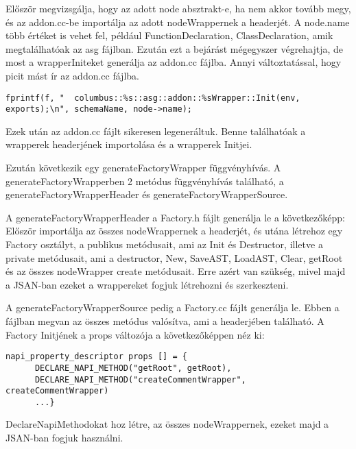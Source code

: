 Először megvizsgálja, hogy az adott node absztrakt-e, ha nem akkor tovább megy, és az addon.cc-be importálja az adott nodeWrappernek a headerjét.
A node.name több értéket is vehet fel, például FunctionDeclaration, ClassDeclaration, amik megtalálhatóak az asg fájlban.
Ezután ezt a bejárást mégegyszer végrehajtja, de most a wrapperIniteket generálja az addon.cc fájlba.
Annyi változtatással, hogy picit mást ír az addon.cc fájlba.
\begin{lstlisting}[caption={generateWrapInit leimplementálása}, label={lst:addoncc_wrapper_inits_implementation}, language={CStyle}]
fprintf(f, "  columbus::%s::asg::addon::%sWrapper::Init(env, exports);\n", schemaName, node->name);
\end{lstlisting}

Ezek után az addon.cc fájlt sikeresen legeneráltuk.
Benne találhatóak a wrapperek headerjének importolása és a wrapperek Initjei.

\noindent

Ezután következik egy generateFactoryWrapper függvényhívás.
A generateFactoryWrapperben 2 metódus függvényhívás található, a generateFactoryWrapperHeader és generateFactoryWrapperSource.

\noindent

A generateFactoryWrapperHeader a Factory.h fájlt generálja le a következőképp:
Először importálja az összes nodeWrappernek a headerjét, és utána létrehoz egy Factory osztályt, a publikus metódusait, ami az Init és Destructor, illetve a private metódusait,
ami a destructor, New, SaveAST, LoadAST, Clear, getRoot és az összes nodeWrapper create metódusait.
Erre azért van szükség, mivel majd a JSAN-ban ezeket a wrappereket fogjuk létrehozni és szerkeszteni.

\noindent

A generateFactoryWrapperSource pedig a Factory.cc fájlt generálja le.
Ebben a fájlban megvan az összes metódus valósítva, ami a headerjében található.
A Factory Initjének a props változója a következőképpen néz ki:

\begin{lstlisting}[caption={Factory.cc fájl}, label={factory_cc}, language={CStyle}]
napi_property_descriptor props [] = {
      DECLARE_NAPI_METHOD("getRoot", getRoot),
      DECLARE_NAPI_METHOD("createCommentWrapper", createCommentWrapper)
      ...}
\end{lstlisting}

DeclareNapiMethodokat hoz létre, az összes nodeWrappernek, ezeket majd a JSAN-ban fogjuk használni.

